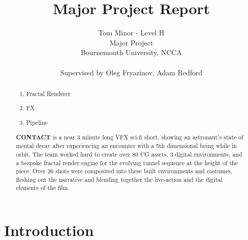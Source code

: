 \documentclass[11pt,a4paper,final,notitlepage]{report}
\makeatletter
\newcommand*{\toccontents}{\@starttoc{toc}}
\makeatother
\begin{document}
\title{ Major Project Report }

\author{ Tom Minor - Level H\\
 		 Major Project\\
 		 Bournemouth University, NCCA\\
 		 \\
 		 Supervised by Oleg Fryazinov, Adam Redford
		}

\date{}
\maketitle

\renewcommand{\abstractname}{Project Overview and Responsibilities}
\begin{abstract}

\begin{center}
\begin{varwidth}{\textwidth}
\begin{enumerate}
\item Fractal Renderer
\item FX
\item Pipeline\\
\end{enumerate}
\end{varwidth}
\end{center}

\textbf{CONTACT} is a near 3 minute long VFX sci-fi short, showing an astronaut’s state of mental decay after experiencing an encounter with a 5th dimensional being while in orbit. The team worked hard to create over 80 CG assets, 3 digital environments, and a bespoke fractal render engine for the evolving tunnel sequence at the height of the piece. Over 26 shots were composited into these built environments and costumes, fleshing out the narrative and blending together the live-action and the digital elements of the film.

\end{abstract}

\toccontents

\chapter{Introduction}
\end{document}
